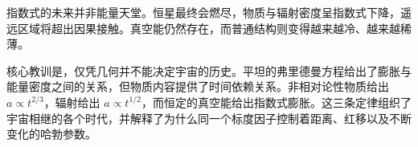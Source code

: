 指数式的未来并非能量天堂。恒星最终会燃尽，物质与辐射密度呈指数式下降，遥远区域将超出因果接触。真空能仍然存在，而普通结构则变得越来越冷、越来越稀薄。

\begin{classroomqa}
\end{classroomqa}

核心教训是，仅凭几何并不能决定宇宙的历史。平坦的弗里德曼方程给出了膨胀与能量密度之间的关系，但物质内容提供了时间依赖关系。非相对论性物质给出 \(a\propto t^{2/3}\)，辐射给出 \(a\propto t^{1/2}\)，而恒定的真空能给出指数式膨胀。这三条定律组织了宇宙相继的各个时代，并解释了为什么同一个标度因子控制着距离、红移以及不断变化的哈勃参数。
